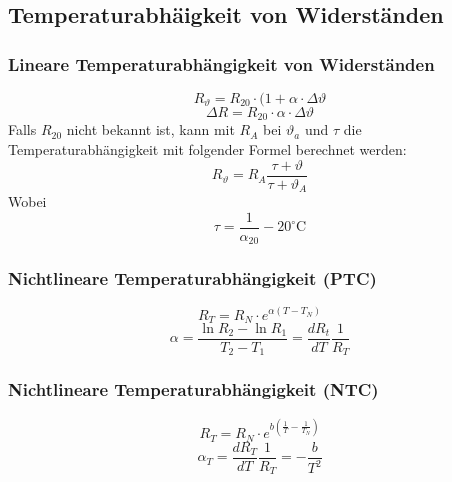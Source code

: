



\subsection{Temperaturabhäigkeit von Widerständen}

\subsubsection{Lineare Temperaturabhängigkeit von Widerständen}
\[ R_\vartheta = R_{20} \cdot (1 + \alpha \cdot \Delta \vartheta \]
\[ \Delta R = R_{20} \cdot \alpha \cdot \Delta \vartheta \]
Falls $R_{20}$ nicht bekannt ist, kann mit $R_A$ bei $\vartheta_a$ und $\tau$ die Temperaturabhängigkeit mit folgender Formel berechnet werden:  \[ R_\vartheta = R_A \frac{\tau + \vartheta}{\tau + \vartheta_A} \]
Wobei 
\[ \tau = \frac{1}{\alpha_20} - 20^{\circ}\text{C} \]

\subsubsection{Nichtlineare Temperaturabhängigkeit (PTC)}
\[ R_T = R_N \cdot e^{\alpha (T - T_N)} \]
\[ \alpha = \frac{\ln R_2 - \ln R_1}{T_2 - T_1} = \frac{d R_t}{d T}\frac{1}{R_T} \]

\subsubsection{Nichtlineare Temperaturabhängigkeit (NTC)}
\[ R_T = R_N \cdot e^{b\left(\frac{1}{T} - \frac{1}{T_N}\right)} \]
\[ \alpha_T = \frac{d R_T}{d T}\frac{1}{R_T} = -\frac{b}{T^2} \]